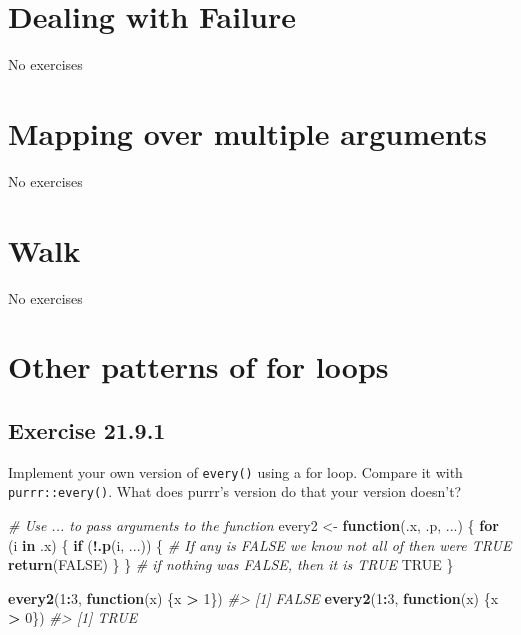 \documentclass[]{book}
\newenvironment{Shaded}{\begin{snugshade}}{\end{snugshade}}
\newcommand{\CommentTok}[1]{\textcolor[rgb]{0.56,0.35,0.01}{\textit{#1}}}
\newcommand{\ControlFlowTok}[1]{\textcolor[rgb]{0.13,0.29,0.53}{\textbf{#1}}}
\newcommand{\DecValTok}[1]{\textcolor[rgb]{0.00,0.00,0.81}{#1}}
\newcommand{\KeywordTok}[1]{\textcolor[rgb]{0.13,0.29,0.53}{\textbf{#1}}}
\newcommand{\NormalTok}[1]{#1}
\newcommand{\OperatorTok}[1]{\textcolor[rgb]{0.81,0.36,0.00}{\textbf{#1}}}
\newcommand{\OtherTok}[1]{\textcolor[rgb]{0.56,0.35,0.01}{#1}}
\newcommand{\StringTok}[1]{\textcolor[rgb]{0.31,0.60,0.02}{#1}}
\theoremstyle{plain}
\theoremstyle{remark}
\begin{document}
\hypertarget{dealing-with-failure}{%
\section{Dealing with Failure}\label{dealing-with-failure}}

No exercises

\hypertarget{mapping-over-multiple-arguments}{%
\section{Mapping over multiple
arguments}\label{mapping-over-multiple-arguments}}

No exercises

\hypertarget{walk}{%
\section{Walk}\label{walk}}

No exercises

\hypertarget{other-patterns-of-for-loops}{%
\section{Other patterns of for
loops}\label{other-patterns-of-for-loops}}

\hypertarget{exercise-21.9.1}{%
\subsection*{\texorpdfstring{Exercise
{21.9.1}}{Exercise 21.9.1}}\label{exercise-21.9.1}}

Implement your own version of \texttt{every()} using a for loop. Compare
it with \texttt{purrr::every()}. What does purrr's version do that your
version doesn't?

\begin{Shaded}
\begin{Highlighting}[]
\CommentTok{# Use ... to pass arguments to the function}
\NormalTok{every2 <-}\StringTok{ }\ControlFlowTok{function}\NormalTok{(.x, .p, ...) \{}
  \ControlFlowTok{for}\NormalTok{ (i }\ControlFlowTok{in}\NormalTok{ .x) \{}
    \ControlFlowTok{if}\NormalTok{ (}\OperatorTok{!}\KeywordTok{.p}\NormalTok{(i, ...)) \{}
      \CommentTok{# If any is FALSE we know not all of then were TRUE}
      \KeywordTok{return}\NormalTok{(}\OtherTok{FALSE}\NormalTok{)}
\NormalTok{    \}}
\NormalTok{  \}}
  \CommentTok{# if nothing was FALSE, then it is TRUE}
  \OtherTok{TRUE}  
\NormalTok{\}}

\KeywordTok{every2}\NormalTok{(}\DecValTok{1}\OperatorTok{:}\DecValTok{3}\NormalTok{, }\ControlFlowTok{function}\NormalTok{(x) \{x }\OperatorTok{>}\StringTok{ }\DecValTok{1}\NormalTok{\})}
\CommentTok{#> [1] FALSE}
\KeywordTok{every2}\NormalTok{(}\DecValTok{1}\OperatorTok{:}\DecValTok{3}\NormalTok{, }\ControlFlowTok{function}\NormalTok{(x) \{x }\OperatorTok{>}\StringTok{ }\DecValTok{0}\NormalTok{\})}
\CommentTok{#> [1] TRUE}
\end{Highlighting}
\end{Shaded}
\end{document}
